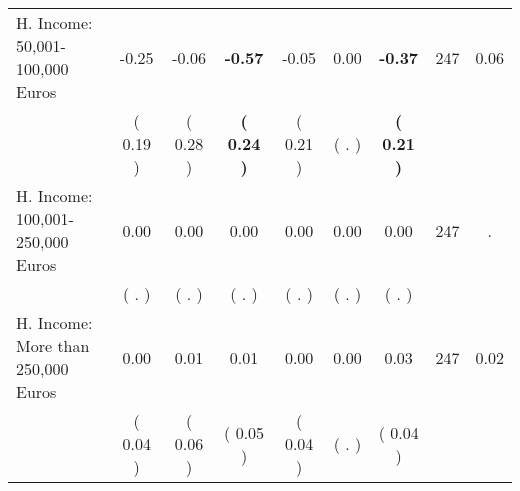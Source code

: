 \begin{tabular}{lcccccccc}
H. Income: 50,001-100,000 Euros &     -0.25 &     -0.06 & \textbf{    -0.57} &     -0.05 &      0.00 & \textbf{    -0.37} & 247 &       0.06 \\ 
 & (     0.19 ) & (     0.28 ) & \textbf{(     0.24 )} & (     0.21 ) & (        . ) & \textbf{(     0.21 )} & \\
H. Income: 100,001-250,000 Euros &      0.00 &      0.00 &      0.00 &      0.00 &      0.00 &      0.00 & 247 &          . \\ 
 & (        . ) & (        . ) & (        . ) & (        . ) & (        . ) & (        . ) & \\
H. Income: More than 250,000 Euros &      0.00 &      0.01 &      0.01 &      0.00 &      0.00 &      0.03 & 247 &       0.02 \\ 
 & (     0.04 ) & (     0.06 ) & (     0.05 ) & (     0.04 ) & (        . ) & (     0.04 ) & \\
\bottomrule
\end{tabular}
